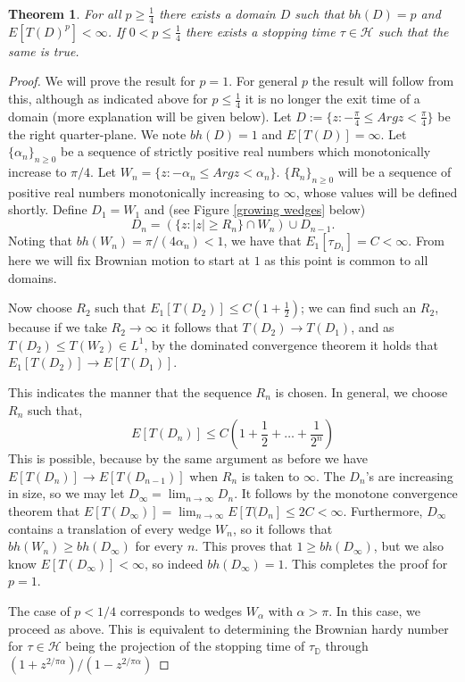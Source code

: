 \documentclass[a4paper, oneside, 12pt]{amsart}
\newcommand{\mc}{\mathcal}
\newcommand{\DD}{\mathbb{D}}
\newtheorem{theorem}{Theorem}[section]
\begin{document}
\begin{theorem}\label{example_finite}
For all $p\geq\frac{1}{4}$ there exists a domain $D$ such that $bh(D) = p$ and $E[T(D)^p] < \infty$. 
If $0<p\leq \frac{1}{4}$ there exists a stopping time $\tau\in\mc{H}$ such that the same is true.
\end{theorem}
\begin{proof}
We will prove the result for $p=1$. For general $p$ the result will follow from this, although as indicated above for $p \leq \frac{1}{4}$ it is no longer the exit time of a domain (more explanation will be given below). Let $D:=\{z:-\frac{\pi}{4} \leq Arg z < \frac{\pi}{4}\}$ be the right quarter-plane. We note
$bh(D) = 1$ and $E[T(D)] = \infty$. Let $\{\alpha_n\}_{n\geq0}$ be a sequence of strictly positive real numbers which monotonically increase to $\pi/4$. Let $W_n = \{z : -\alpha_n \leq Arg z < \alpha_n\}$. $\{R_n\}_{n\geq0}$ will be a sequence of positive real numbers monotonically increasing to $\infty$, whose values will be defined shortly. Define $D_1 = W_1$ and (see Figure \ref{growing wedges} below)
$$
    D_n = \left(\{z: |z|\geq R_n\} \cap W_n\right) \cup D_{n-1}.
$$
Noting that $bh(W_n) = \pi/(4\alpha_n)<1$, we have that $E_1[\tau_{D_1}] = C < \infty$. From here we will fix Brownian motion to start at $1$ as this point is common to all domains. 

Now choose $R_2$ such that $E_1[T(D_2)] \leq C(1+\frac{1}{2})$; we can find such an $R_2$, because 
if we take $R_2\to\infty$ it follows that $T(D_2)\to T(D_1)$, and as $T(D_2)\leq T(W_2)\in L^1$, by the dominated convergence theorem it holds that $E_1[T(D_2)] \to E[T(D_1)]$. 

This indicates the manner that the sequence $R_n$ is chosen. In general, we choose $R_n$ such that,
$$
    E[T(D_n)] \leq C(1+\frac{1}{2} + \ldots + \frac{1}{2^n} )
$$
This is possible, because by the same argument as before we have $E[T(D_n)] \to E[T(D_{n-1})]$ when $R_n$ is taken to $\infty$. The $D_n$'s are increasing in size, so we may let $D_\infty = \lim_{n\to\infty} D_{n}$. It follows by the monotone convergence theorem that $E[T(D_\infty)] = \lim_{n \to \infty} E[T(D_n] \leq 2C < \infty$. Furthermore, $D_\infty$ contains a translation of every wedge $W_n$, so it follows that $bh(W_n) \geq bh(D_\infty)$ for every $n$. This proves that $1\geq bh(D_\infty)$, but we also know $E[T(D_\infty)]<\infty$, so indeed
$bh(D_\infty) = 1$. This completes the proof for $p=1$.

The case of $p < 1/4$ corresponds to wedges $W_\alpha$ with $\alpha > \pi$. In this case, we proceed as above. This is equivalent to determining the 
Brownian hardy number for $\tau\in\mc{H}$ being the projection of the stopping time of $\tau_{\DD}$ through $(1+z^{2/\pi \alpha})/(1-z^{2/\pi\alpha})$
\fi


\end{proof}
\end{document}
